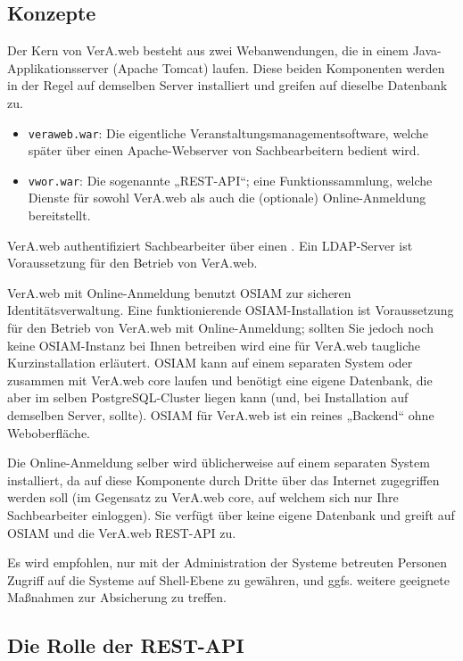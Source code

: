 \subsection{Konzepte}\label{subsec:concepts}

Der Kern von VerA.web besteht aus zwei Webanwendungen, die in einem
Java-Applikationsserver (Apache Tomcat) laufen. Diese beiden Komponenten
werden in der Regel auf demselben Server installiert und greifen auf
dieselbe Datenbank zu.

\begin{itemize}
 \item{\texttt{veraweb.war}: Die eigentliche Veranstaltungsmanagementsoftware,
  welche später über einen Apache-Webserver von Sachbearbeitern bedient wird.}
 \item{\texttt{vwor.war}: Die sogenannte „REST-API“; eine Funktionssammlung,
  welche Dienste für sowohl VerA.web als auch die (optionale) Online-Anmeldung
  bereitstellt.}
\end{itemize}

VerA.web authentifiziert Sachbearbeiter über einen .
Ein LDAP-Server ist Voraussetzung für den Betrieb von VerA.web.

\ifoa
VerA.web mit Online-Anmeldung benutzt OSIAM zur sicheren Identitätsverwaltung.
Eine funktionierende OSIAM-Installation ist Voraussetzung für den Betrieb von
VerA.web mit Online-Anmeldung; sollten Sie jedoch noch keine OSIAM-Instanz bei
Ihnen betreiben wird eine für VerA.web taugliche Kurzinstallation erläutert.
OSIAM kann auf einem separaten System oder zusammen mit VerA.web core laufen
und benötigt eine eigene Datenbank, die aber im selben PostgreSQL-Cluster
liegen kann (und, bei Installation auf demselben Server, sollte). OSIAM für
VerA.web ist ein reines „Backend“ ohne Weboberfläche.

Die Online-Anmeldung selber wird üblicherweise auf einem separaten System
installiert, da auf diese Komponente durch Dritte über das Internet
zugegriffen werden soll (im Gegensatz zu VerA.web core, auf welchem
sich nur Ihre Sachbearbeiter einloggen). Sie verfügt über keine eigene
Datenbank und greift auf OSIAM und die VerA.web REST-API zu.
\fi%

Es wird empfohlen, nur mit der Administration der Systeme betreuten
Personen Zugriff auf die Systeme auf Shell-Ebene zu gewähren, und
ggfs. weitere geeignete Maßnahmen zur Absicherung zu treffen.

\subsection{Die Rolle der REST-API}\label{subsec:intro-restapi}


